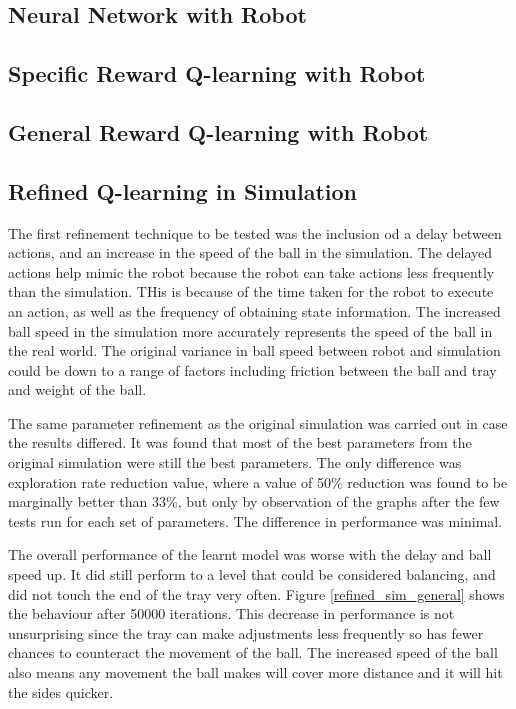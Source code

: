 \documentclass[12pt,a4paper]{article}
\begin{document}
\subsection{Neural Network with Robot}
\subsection{Specific Reward Q-learning with Robot}
\subsection{General Reward Q-learning with Robot}
\subsection{Refined Q-learning in Simulation}
The first refinement technique to be tested was the inclusion od a delay between actions, and an increase in the speed of the ball in the simulation. The delayed actions help mimic the robot because the robot can take actions less frequently than the simulation. THis is because of the time taken for the robot to execute an action, as well as the frequency of obtaining state information. The increased ball speed in the simulation more accurately represents the speed of the ball in the real world. The original variance in ball speed between robot and simulation could be down to a range of factors including friction between the ball and tray and weight of the ball.

The same parameter refinement as the original simulation was carried out in case the results differed. It was found that most of the best parameters from the original simulation were still the best parameters. The only difference was exploration rate reduction value, where a value of 50\% reduction was found to be marginally better than 33\%, but only by observation of the graphs after the few tests run for each set of parameters. The difference in performance was minimal.

The overall performance of the learnt model was worse with the delay and ball speed up. It did still perform to a level that could be considered balancing, and did not touch the end of the tray very often. Figure \ref{refined_sim_general} shows the behaviour after 50000 iterations. This decrease in performance is not unsurprising since the tray can make adjustments less frequently so has fewer chances to counteract the movement of the ball. The increased speed of the ball also means any movement the ball makes will cover more distance and it will hit the sides quicker.
\end{document}
